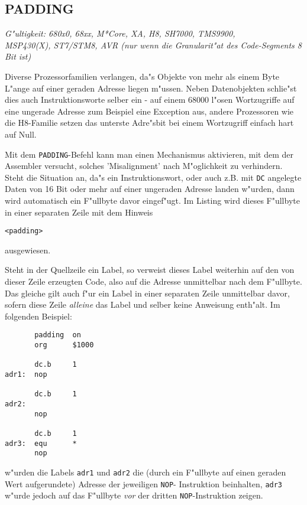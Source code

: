 \documentclass[12pt,a4paper,twoside]{report}
\makeatletter
\newcommand{\tty}[1]{{\tt #1}}
\newcommand{\ttindex}[1]{\index{#1@{\tt #1}}}
\makeatother
\begin{document}

\subsection{PADDING}
\ttindex{PADDING}

{\em G"ultigkeit: 680x0, 68xx, M*Core, XA, H8, SH7000, TMS9900,\\
     MSP430(X), ST7/STM8, AVR (nur wenn die Granularit"at des Code-Segments
     8 Bit ist)}

Diverse Prozessorfamilien verlangen, da"s Objekte von mehr als einem
Byte L"ange auf einer geraden Adresse liegen m"ussen.  Neben Datenobjekten
schlie"st dies auch Instruktionsworte selber ein - auf einem 68000
l"osen Wortzugriffe auf eine ungerade Adresse zum Beispiel eine
Exception aus, andere Prozessoren wie die H8-Familie setzen das
unterste Adre"sbit bei einem Wortzugriff einfach hart auf Null.

Mit dem \tty{PADDING}-Befehl kann man einen Mechanismus aktivieren,
mit dem der Assembler versucht, solches 'Misalignment' nach M"oglichkeit
zu verhindern.  Steht die Situation an, da"s ein Instruktionswort,
oder auch z.B. mit \tty{DC} angelegte Daten von 16 Bit oder mehr auf
einer ungeraden Adresse landen w"urden, dann wird automatisch ein F"ullbyte
davor eingef"ugt.  Im Listing wird dieses F"ullbyte in einer separaten
Zeile mit dem Hinweis
\begin{verbatim}
<padding>
\end{verbatim}
ausgewiesen.

Steht in der Quellzeile ein Label, so verweist dieses Label weiterhin
auf den von dieser Zeile erzeugten Code, also auf die Adresse unmittelbar
nach dem F"ullbyte.  Das gleiche gilt auch f"ur ein Label in einer
separaten Zeile unmittelbar davor, sofern diese Zeile {\em alleine} das
Label und selber keine Anweisung enth"alt.  Im folgenden Beispiel:
\begin{verbatim}
       padding  on
       org      $1000

       dc.b     1
adr1:  nop

       dc.b     1
adr2:
       nop

       dc.b     1
adr3:  equ      *
       nop
\end{verbatim}
w"urden die Labels \tty{adr1} und \tty{adr2} die (durch ein F"ullbyte
auf einen geraden Wert aufgerundete) Adresse der jeweiligen \tty{NOP}-
Instruktion beinhalten, \tty{adr3} w"urde jedoch auf das F"ullbyte {\em vor}
der dritten \tty{NOP}-Instruktion zeigen.
\end{document}
